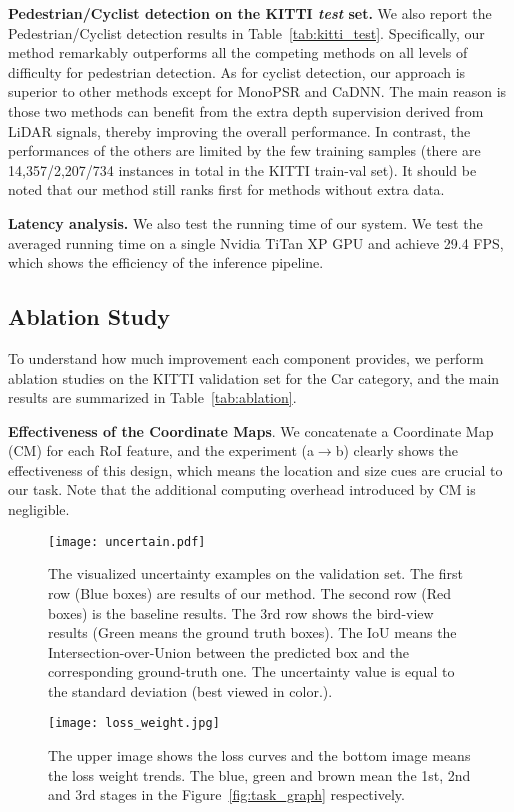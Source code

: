 \documentclass[10pt,twocolumn,letterpaper]{article}
\begin{document}
\noindent
{\bf Pedestrian/Cyclist detection on the KITTI \emph{test} set.}
We also report the Pedestrian/Cyclist detection results in Table~\ref{tab:kitti_test}. 
Specifically, our method remarkably outperforms all the competing methods on all levels of difficulty for pedestrian detection. 
As for cyclist detection, our approach is superior to other methods except for MonoPSR and CaDNN.
The main reason is those two methods can benefit from the extra depth supervision derived from LiDAR signals, thereby improving the overall performance.
In contrast, the performances of the others are limited by the few training samples (there are 14,357/2,207/734 instances in total in the KITTI train-val set).
It should be noted that our method still ranks first for methods without extra data.


\noindent
{\bf Latency analysis.}
We also test the running time of our system. We test the averaged running time on a single Nvidia TiTan XP GPU and achieve 29.4 FPS, which shows the efficiency of the inference pipeline. 


\subsection{Ablation Study} 
To understand how much improvement each component provides, we perform ablation studies on the KITTI validation set for the Car category, and the main results are summarized in Table~\ref{tab:ablation}. 

\noindent
{\bf Effectiveness of the Coordinate Maps}.
We concatenate a Coordinate Map (CM) for each RoI feature, and the experiment (a$\rightarrow$b) clearly shows the effectiveness of this design, which means the location and size cues are crucial to our task.
Note that the additional computing overhead introduced by CM is negligible.
\begin{figure*}[t]
\begin{center}
\texttt{[image: uncertain.pdf]}
\end{center}
   \caption{The visualized uncertainty examples on the validation set. The first row (\textcolor[RGB]{0,102,153}{Blue} boxes) are results of our method. The second row (\textcolor[RGB]{178,34,34}{Red} boxes) is the baseline results. The 3rd row shows the bird-view results (\textcolor[RGB]{50,205,50}{Green} means the ground truth boxes). The IoU means the Intersection-over-Union between the predicted box and the corresponding ground-truth one. The uncertainty value is equal to the standard deviation (best viewed in color.).}
\label{fig:uncertain}
\end{figure*}
\begin{figure}[t]
\begin{center}
\texttt{[image: loss\_weight.jpg]}
\end{center}
   \caption{The upper image shows the loss curves and the bottom image means the loss weight trends. The blue, green and brown mean the 1st, 2nd and 3rd stages in the Figure~\ref{fig:task_graph} respectively.}
\label{fig:loss_weight}
\end{figure}
\end{document}
